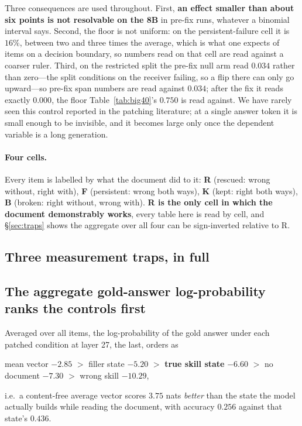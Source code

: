 \documentclass{article}
\begin{document}
Three consequences are used throughout. First, \textbf{an effect smaller than
about six points is not resolvable on the 8B} in pre-fix runs, whatever a
binomial interval says. Second, the floor is not uniform: on the
persistent-failure cell it is $16\%$, between two and three times the average,
which is what one expects of items on a
decision boundary, so numbers read on that cell are read against a coarser
ruler. Third, on the restricted split the pre-fix null arm read $0.034$ rather than
zero---the split conditions on the receiver failing, so a flip there can only go
upward---so pre-fix span numbers are read against $0.034$; after the fix it reads
exactly $0.000$, the floor Table~\ref{tab:big40}'s $0.750$ is read against. We have rarely seen this control reported in the patching literature; at a single answer token it is small enough to be invisible, and it
becomes large only once the dependent variable is a long generation.

\paragraph{Four cells.}

Every item is labelled by what the document did to it: \textbf{R} (rescued:
wrong without, right with), \textbf{F} (persistent: wrong both ways), \textbf{K}
(kept: right both ways), \textbf{B} (broken: right without, wrong with).
\textbf{R is the only cell in which the document demonstrably works}, every table
here is read by cell, and \S\ref{sec:traps} shows the aggregate over all four can
be sign-inverted relative to R.




\subsection{Three measurement traps, in full}
\label{app:traps}

\subsection{The aggregate gold-answer log-probability ranks the controls first}

Averaged over all items, the log-probability of the gold answer under each
patched condition at layer 27, the last, orders as
\begin{center}
mean vector $-2.85$ \; $>$ \; filler state $-5.20$ \; $>$ \; \textbf{true skill
state} $-6.60$ \; $>$ \; no document $-7.30$ \; $>$ \; wrong skill $-10.29$,
\end{center}
i.e.\ a content-free average vector scores $3.75$ nats \emph{better} than the
state the model actually builds while reading the document, with accuracy
$0.256$ against that state's $0.436$.
\end{document}
